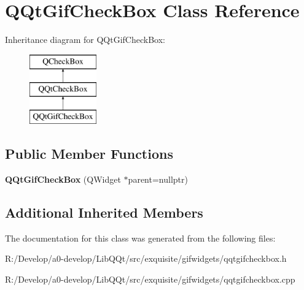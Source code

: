 \hypertarget{class_q_qt_gif_check_box}{}\section{Q\+Qt\+Gif\+Check\+Box Class Reference}
\label{class_q_qt_gif_check_box}
Inheritance diagram for Q\+Qt\+Gif\+Check\+Box\+:\begin{figure}[H]
\begin{center}
\leavevmode
\includegraphics[height=3.000000cm]{class_q_qt_gif_check_box}
\end{center}
\end{figure}
\subsection*{Public Member Functions}
\begin{DoxyCompactItemize}
\item 
\mbox{\label{class_q_qt_gif_check_box_a5dba18f1126e5e612f0d786524a9c3f9}} 
{\bfseries Q\+Qt\+Gif\+Check\+Box} (Q\+Widget $\ast$parent=nullptr)
\end{DoxyCompactItemize}
\subsection*{Additional Inherited Members}


The documentation for this class was generated from the following files\+:\begin{DoxyCompactItemize}
\item 
R\+:/\+Develop/a0-\/develop/\+Lib\+Q\+Qt/src/exquisite/gifwidgets/qqtgifcheckbox.\+h\item 
R\+:/\+Develop/a0-\/develop/\+Lib\+Q\+Qt/src/exquisite/gifwidgets/qqtgifcheckbox.\+cpp\end{DoxyCompactItemize}
